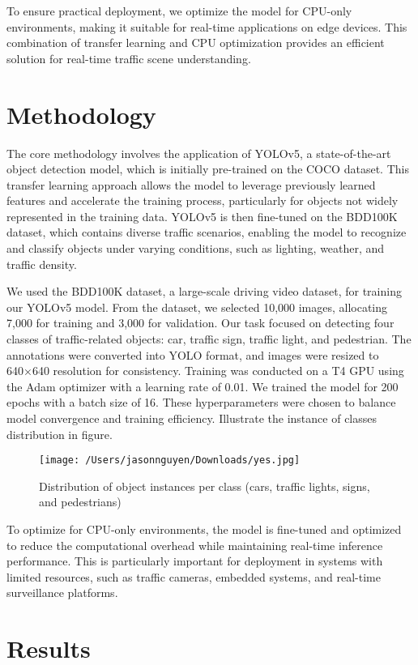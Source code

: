 \documentclass[11pt]{article}
\begin{document}
To ensure practical deployment, we optimize the model for CPU-only environments, making it suitable for real-time applications on edge devices. This combination of transfer learning and CPU optimization provides an efficient solution for real-time traffic scene understanding.
\section{Methodology}
The core methodology involves the application of YOLOv5, a state-of-the-art object detection model, which is initially pre-trained on the COCO dataset. This transfer learning approach allows the model to leverage previously learned features and accelerate the training process, particularly for objects not widely represented in the training data. YOLOv5 is then fine-tuned on the BDD100K dataset, which contains diverse traffic scenarios, enabling the model to recognize and classify objects under varying conditions, such as lighting, weather, and traffic density.

We used the BDD100K dataset, a large-scale driving video dataset, for training our YOLOv5 model. From the dataset, we selected 10,000 images, allocating 7,000 for training and 3,000 for validation. Our task focused on detecting four classes of traffic-related objects: car, traffic sign, traffic light, and pedestrian. The annotations were converted into YOLO format, and images were resized to 640×640 resolution for consistency. Training was conducted on a T4 GPU using the Adam optimizer with a learning rate of 0.01. We trained the model for 200 epochs with a batch size of 16. These hyperparameters were chosen to balance model convergence and training efficiency.  Illustrate the instance of classes distribution in figure. 
\begin{figure}[H]
    \centering
    \texttt{[image: /Users/jasonnguyen/Downloads/yes.jpg]}
    \caption{Distribution of object instances per class (cars, traffic lights, signs, and pedestrians)}
    \label{fig: class distribution}
\end{figure}

To optimize for CPU-only environments, the model is fine-tuned and optimized to reduce the computational overhead while maintaining real-time inference performance. This is particularly important for deployment in systems with limited resources, such as traffic cameras, embedded systems, and real-time surveillance platforms.

\section{Results}
\end{document}
